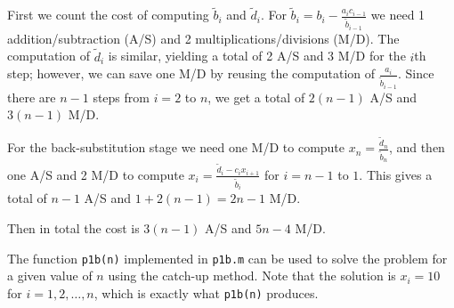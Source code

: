 \documentclass{homework}
\begin{document}
	\maketitle
	
	\question 
	\begin{alphaparts}
		\newcommand{\bt}{\tilde{b}}
		\newcommand{\dt}{\tilde{d}}
		\questionpart First we count the cost of computing $\bt_i$ and $\dt_i$. For $\bt_i = b_i - \frac{a_ic_{i-1}}{\bt_{i-1}}$ we need 1 addition/subtraction (A/S) and 2 multiplications/divisions (M/D). The computation of $\dt_i$ is similar, yielding a total of 2 A/S and 3 M/D for the $i$th step; however, we can save one M/D by reusing the computation of $\frac{a_i}{\bt_{i-1}}$. Since there are $n-1$ steps from $i=2$ to $n$, we get a total of $2(n-1)$ A/S and $3(n-1)$ M/D. 
		
		For the back-substitution stage we need one M/D to compute $x_n = \frac{\dt_n}{\bt_n}$, and then one A/S and 2 M/D to compute $x_i = \frac{\dt_i - c_ix_{i+1}}{\bt_i}$ for $i = n-1$ to $1$. This gives a total of $n-1$ A/S and $1 + 2(n-1) = 2n-1$ M/D.
		
		Then in total the cost is $3(n-1)$ A/S and $5n-4$ M/D.
		
		\questionpart The function \texttt{p1b(n)} implemented in \texttt{p1b.m} can be used to solve the problem for a given value of $n$ using the catch-up method. Note that the solution is $x_i = 10$ for $i=1,2,\dots, n$, which is exactly what \texttt{p1b(n)} produces.
	\end{alphaparts}
	
\end{document}
